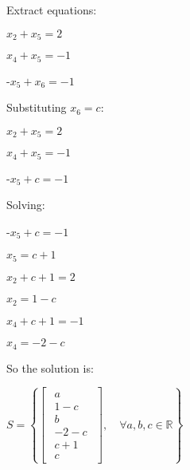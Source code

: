 \singlespacing

Extract equations:

\singlespacing

$x_2 + x_5 = 2$

$x_4 + x_5 = -1$

-$x_5 + x_6 = -1$

\singlespacing

Substituting $x_6 = c$:

\singlespacing

$x_2 + x_5 = 2$

$x_4 + x_5 = -1$

-$x_5 + c = -1$

\singlespacing

Solving:

\singlespacing

-$x_5 + c = -1$

$x_5 = c + 1$

\singlespacing

$x_2 + c + 1 = 2$

$x_2 = 1 - c$

\singlespacing

$x_4 + c + 1 = -1$

$x_4 = -2 - c$

\singlespacing

So the solution is:

\singlespacing

\begin{math}
    S = \left\{
    \begin{bmatrix}
        \begin{array}{c}
            a      \\
            1 - c  \\
            b      \\
            -2 - c \\
            c + 1  \\
            c
        \end{array}
    \end{bmatrix},\quad
    \forall a, b, c \in \mathbb{R}
    \right\}
\end{math}
